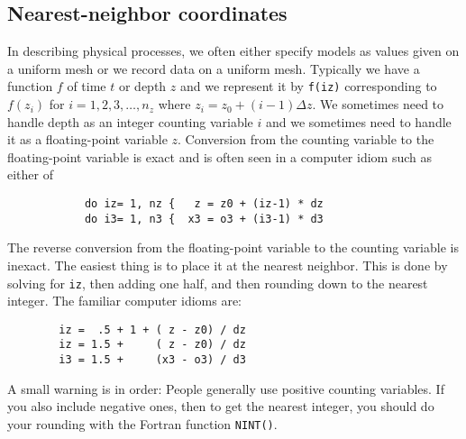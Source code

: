 \subsection{Nearest-neighbor coordinates}
In describing physical processes,
we often either specify models as values given on a uniform mesh
or we record data on a uniform mesh.
Typically we have
a function $f$ of time $t$ or depth $z$
and we represent it by {\tt f(iz)}
corresponding to $f(z_i)$ for $i=1,2,3,\ldots, n_z$
where $z_i = z_0+ (i-1)\Delta z$.
We sometimes need to handle depth as
an integer counting variable $i$
and we sometimes need to handle it as
a floating-point variable $z$.
Conversion from the counting variable to the floating-point variable
is exact and is often seen in a computer idiom
such as either of \begin{verbatim}
            do iz= 1, nz {   z = z0 + (iz-1) * dz 
            do i3= 1, n3 {  x3 = o3 + (i3-1) * d3
\end{verbatim}
The reverse conversion from the floating-point variable
to the counting variable is inexact.
The easiest thing is to place it at the nearest neighbor.
This is done by solving for {\tt iz}, then adding one half,
and then rounding down to the nearest integer.
The familiar computer idioms are:\begin{verbatim}
        iz =  .5 + 1 + ( z - z0) / dz
        iz = 1.5 +     ( z - z0) / dz
        i3 = 1.5 +     (x3 - o3) / d3
\end{verbatim}
A small warning is in order:
People generally use positive counting variables.
If you also include negative ones,
then to get the nearest integer,
you should do your rounding with the Fortran function {\tt NINT()}.

